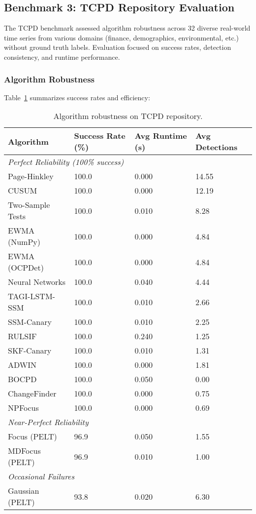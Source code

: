 \subsection{Benchmark 3: TCPD Repository Evaluation}

The TCPD benchmark assessed algorithm robustness across 32 diverse real-world time series from various domains (finance, demographics, environmental, etc.) without ground truth labels. Evaluation focused on success rates, detection consistency, and runtime performance.

\subsubsection{Algorithm Robustness}

Table~\ref{tab:tcpd_robustness} summarizes success rates and efficiency:

\begin{table}[H]
\caption{Algorithm robustness on TCPD repository.\label{tab:tcpd_robustness}}
\begin{tabularx}{\textwidth}{lXXX}
\toprule
\textbf{Algorithm} & \textbf{Success Rate (\%)} & \textbf{Avg Runtime (s)} & \textbf{Avg Detections} \\
\midrule
\multicolumn{4}{l}{\textit{Perfect Reliability (100\% success)}} \\
\midrule
Page-Hinkley & 100.0 & 0.000 & 14.55 \\
CUSUM & 100.0 & 0.000 & 12.19 \\
Two-Sample Tests & 100.0 & 0.010 & 8.28 \\
EWMA (NumPy) & 100.0 & 0.000 & 4.84 \\
EWMA (OCPDet) & 100.0 & 0.000 & 4.84 \\
Neural Networks & 100.0 & 0.040 & 4.44 \\
TAGI-LSTM-SSM & 100.0 & 0.010 & 2.66 \\
SSM-Canary & 100.0 & 0.010 & 2.25 \\
RULSIF & 100.0 & 0.240 & 1.25 \\
SKF-Canary & 100.0 & 0.010 & 1.31 \\
ADWIN & 100.0 & 0.000 & 1.81 \\
BOCPD & 100.0 & 0.050 & 0.00 \\
ChangeFinder & 100.0 & 0.000 & 0.75 \\
NPFocus & 100.0 & 0.000 & 0.69 \\
\midrule
\multicolumn{4}{l}{\textit{Near-Perfect Reliability}} \\
\midrule
Focus (PELT) & 96.9 & 0.050 & 1.55 \\
MDFocus (PELT) & 96.9 & 0.010 & 1.00 \\
\midrule
\multicolumn{4}{l}{\textit{Occasional Failures}} \\
\midrule
Gaussian (PELT) & 93.8 & 0.020 & 6.30 \\
\bottomrule
\end{tabularx}
\end{table}

